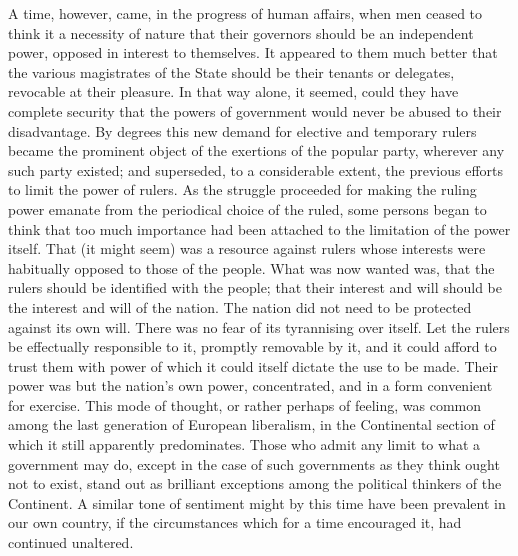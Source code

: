 \documentclass[11pt,openany]{book}
\begin{document}
A time, however, came, in the progress of human affairs, when men ceased to think it a necessity of nature that their governors should be an independent power, opposed in interest to themselves. It appeared to them much better that the various magistrates of the State should be their tenants or delegates, revocable at their pleasure. In that way alone, it seemed, could they have complete security that the powers of government would never be abused to their disadvantage. By degrees this new demand for elective and temporary rulers became the prominent object of the exertions of the popular party, wherever any such party existed; and superseded, to a considerable extent, the previous efforts to limit the power of rulers. As the struggle proceeded for making the ruling power emanate from the periodical choice of the ruled, some persons began to think that too much importance had been attached to the limitation of the power itself. That (it might seem) was a resource against rulers whose interests were habitually opposed to those of the people. What was now wanted was, that the rulers should be identified with the people; that their interest and will should be the interest and will of the nation. The nation did not need to be protected against its own will. There was no fear of its tyrannising over itself. Let the rulers be effectually responsible to it, promptly removable by it, and it could afford to trust them with power of which it could itself dictate the use to be made. Their power was but the nation's own power, concentrated, and in a form convenient for exercise. This mode of thought, or rather perhaps of feeling, was common among the last generation of European liberalism, in the Continental section of which it still apparently predominates. Those who admit any limit to what a government may do, except in the case of such governments as they think ought not to exist, stand out as brilliant exceptions among the political thinkers of the Continent. A similar tone of sentiment might by this time have been prevalent in our own country, if the circumstances which for a time encouraged it, had continued unaltered.
\end{document}
